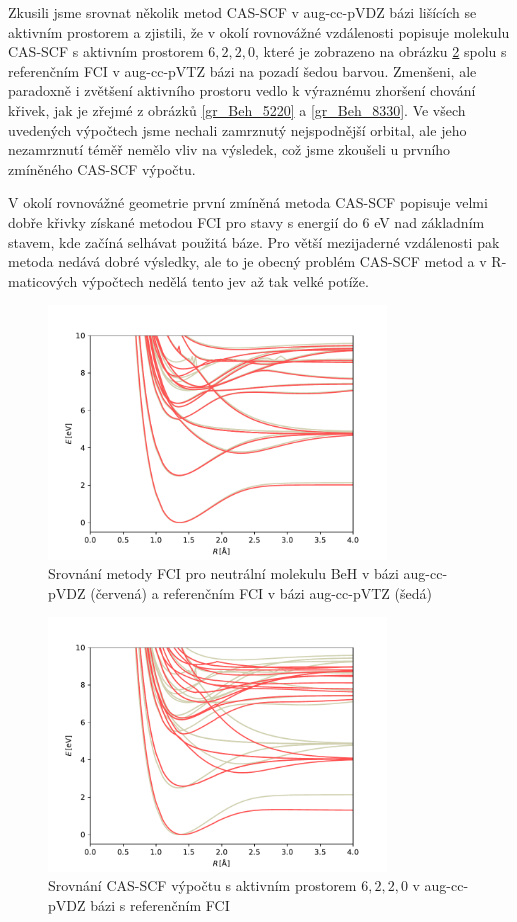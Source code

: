 Zkusili jsme srovnat několik metod CAS-SCF v aug-cc-pVDZ bázi lišících se aktivním 
prostorem a zjistili, že v okolí rovnovážné vzdálenosti popisuje molekulu CAS-SCF s 
aktivním prostorem $6,2,2,0$, které je zobrazeno na obrázku \ref{gr_Beh_6220} spolu s 
referenčním FCI v aug-cc-pVTZ bázi na pozadí šedou barvou. Zmenšeni, ale paradoxně i 
zvětšení aktivního prostoru vedlo k výraznému zhoršení chování křivek, jak je zřejmé z 
obrázků \ref{gr_Beh_5220} a \ref{gr_Beh_8330}. Ve všech uvedených výpočtech jsme 
nechali zamrznutý nejspodnější orbital, ale jeho nezamrznutí téměř nemělo vliv na výsledek, 
což jsme zkoušeli u prvního zmíněného CAS-SCF výpočtu.

V okolí rovnovážné geometrie první zmíněná metoda CAS-SCF popisuje velmi dobře křivky 
získané metodou FCI pro stavy s energií do 6 eV nad základním stavem, kde začíná 
selhávat použitá báze. Pro větší mezijaderné vzdálenosti pak metoda nedává dobré výsledky, ale to je obecný problém CAS-SCF metod a v R-maticových výpočtech nedělá tento jev až tak velké potíže.

\begin{figure}
\centering
\includegraphics[width=0.8\textwidth]{../img/BeH-FCI-DZ.pdf}
\caption{Srovnání metody FCI pro neutrální molekulu BeH v bázi aug-cc-pVDZ (červená) a referenčním FCI v bázi aug-cc-pVTZ (šedá)}
\label{gr_Beh_FCI}
\end{figure}

\begin{figure}
\centering
\includegraphics[width=0.8\textwidth]{../img/BeH-MULTI-DZ-6220.pdf}
\caption{Srovnání CAS-SCF výpočtu s aktivním prostorem $6,2,2,0$ v aug-cc-pVDZ bázi s referenčním FCI}
\label{gr_Beh_6220}
\end{figure}

